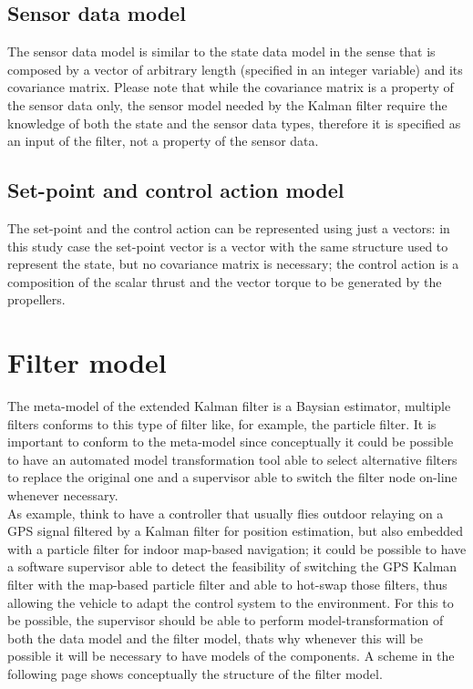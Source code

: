 \subsection{Sensor data model}
The sensor data model is similar to the state data model in the sense that is composed by a vector of arbitrary length (specified in an integer variable) and its covariance matrix. Please note that while the covariance matrix is a property of the sensor data only, the sensor model needed by the Kalman filter require the knowledge of both the state and the sensor data types, therefore it is specified as an input of the filter, not a property of the sensor data.

\subsection{Set-point and control action model}
The set-point and the control action can be represented using just a vectors: in this study case the set-point vector is a vector with the same structure used to represent the state, but no covariance matrix is necessary; the control action is a composition of the scalar thrust and the vector torque to be generated by the propellers.

\section{Filter model}
The meta-model of the extended Kalman filter is a Baysian estimator, multiple filters conforms to this type of filter like, for example, the particle filter. It is important to conform to the meta-model since conceptually it could be possible to have an automated model transformation tool able to select alternative filters to replace the original one and a supervisor able to switch the filter node on-line whenever necessary.\\
As example, think to have a controller that usually flies outdoor relaying on a GPS signal filtered by a Kalman filter for position estimation, but also embedded with a particle filter for indoor map-based navigation; it could be possible to have a software supervisor able to detect the feasibility of switching the GPS Kalman filter with the map-based particle filter and able to hot-swap those filters, thus allowing the vehicle to adapt the control system to the environment. For this to be possible, the supervisor should be able to perform model-transformation of both the data model and the filter model, thats why whenever this will be possible it will be necessary to have models of the components. A scheme in the following page shows conceptually the structure of the filter model.

\begin{figure}[ht]
\label{figmodel}
\end{figure}

